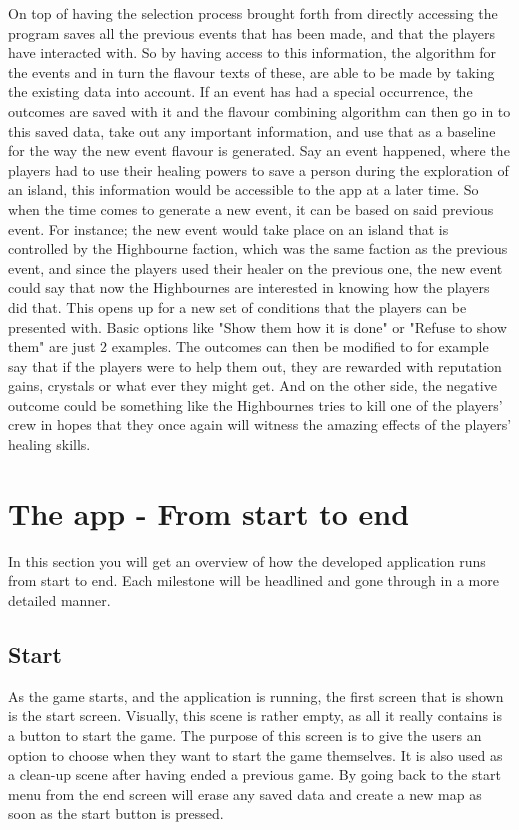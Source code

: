 On top of having the selection process brought forth from directly accessing the program saves all the previous events that has been made, and that the players have interacted with. So by having access to this information, the algorithm for the events and in turn the flavour texts of these, are able to be made by taking the existing data into account. If an event has had a special occurrence, the outcomes are saved with it and the flavour combining algorithm can then go in to this saved data, take out any important information, and use that as a baseline for the way the new event flavour is generated. Say an event happened, where the players had to use their healing powers to save a person during the exploration of an island, this information would be accessible to the app at a later time. So when the time comes to generate a new event, it can be based on said previous event. For instance; the new event would take place on an island that is controlled by the Highbourne faction, which was the same faction as the previous event, and since the players used their healer on the previous one, the new event could say that now the Highbournes are interested in knowing how the players did that. This opens up for a new set of conditions that the players can be presented with. Basic options like "Show them how it is done" or "Refuse to show them" are just 2 examples. The outcomes can then be modified to for example say that if the players were to help them out, they are rewarded with reputation gains, crystals or what ever they might get. And on the other side, the negative outcome could be something like the Highbournes tries to kill one of the players' crew in hopes that they once again will witness the amazing effects of the players' healing skills.



\section{The app - From start to end}
In this section you will get an overview of how the developed application runs from start to end. Each milestone will be headlined and gone through in a more detailed manner.

\subsection{Start}
As the game starts, and the application is running, the first screen that is shown is the start screen. Visually, this scene is rather empty, as all it really contains is a button to start the game. The purpose of this screen is to give the users an option to choose when they want to start the game themselves. It is also used as a clean-up scene after having ended a previous game. By going back to the start menu from the end screen will erase any saved data and create a new map as soon as the start button is pressed.

